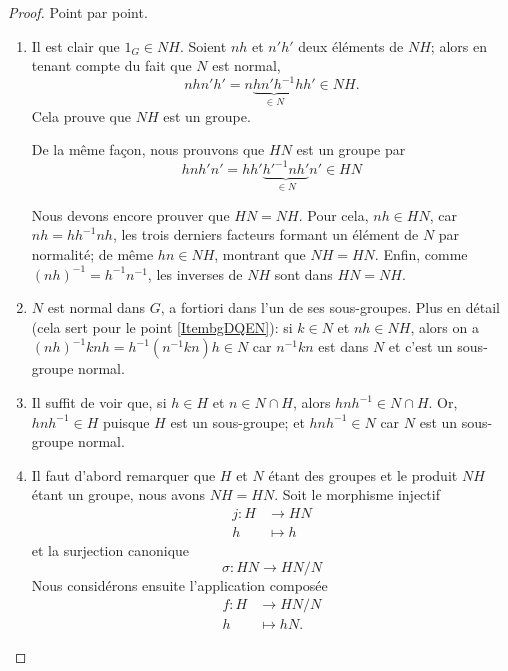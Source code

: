 \begin{proof}
    Point par point.
    \begin{enumerate}
        \item
            Il est clair que \( 1_G \in NH \). Soient $nh$ et $n'h'$ deux éléments de \( NH \); alors en tenant compte du fait que \( N\) est normal,
            \begin{equation}
                nhn'h'=n\underbrace{hn'h^{-1}}_{\in N}hh'\in NH.
            \end{equation}
            Cela prouve que \( NH\) est un groupe.

            De la même façon, nous prouvons que \( HN\) est un groupe par
            \begin{equation}
                hnh'n'=hh'\underbrace{h'^{-1}nh'}_{\in N}n'\in HN
            \end{equation}

            Nous devons encore prouver que \( HN=NH\). Pour cela, \( nh \in HN \), car \( nh = hh^{-1}nh \), les trois derniers facteurs formant un  élément de \( N \) par normalité; de même \( hn \in NH \), montrant que \( NH = HN \). Enfin, comme \( (nh)^{-1} = h^{-1} n^{-1} \), les inverses de \( NH \) sont dans \( HN = NH \).
        \item
            \( N\) est normal dans \( G \), a fortiori dans l'un de ses sous-groupes. Plus en détail (cela sert pour le point \ref{ItembgDQEN}): si \( k \in N \) et \( nh \in NH \), alors on a \( (nh)^{-1}knh = h^{-1} (n^{-1}kn) h \in N \) car \(n^{-1}kn\) est dans \( N \) et c'est un sous-groupe normal.
        \item
            Il suffit de voir que, si \( h \in H \) et \( n \in N \cap H \), alors \( hnh^{-1} \in N \cap H \). Or, \( hnh^{-1} \in H \) puisque \( H\) est un sous-groupe; et \( hnh^{-1} \in N \) car \( N \) est un sous-groupe normal.
        \item
            Il faut d'abord remarquer que \( H\) et \( N\) étant des groupes et le produit \( NH\) étant un groupe, nous avons \( NH=HN\). Soit le morphisme injectif
            \begin{equation}
                \begin{aligned}
                    j\colon H&\to HN \\
                    h&\mapsto h
                \end{aligned}
            \end{equation}
            et la surjection canonique
            \begin{equation}
                \sigma\colon HN\to HN/N
            \end{equation}
            Nous considérons ensuite l'application composée
            \begin{equation}
                \begin{aligned}
                    f\colon H&\to HN/N \\
                    h&\mapsto hN.
                \end{aligned}
            \end{equation}


\end{enumerate}
\end{proof}
